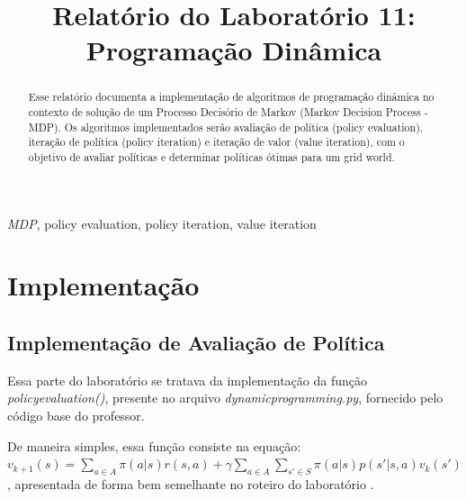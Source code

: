 \documentclass[conference]{IEEEtran}
\begin{document}
\title{Relatório do Laboratório 11: \\ Programação Dinâmica\\
}

\author{
}

\maketitle

\begin{abstract}
Esse relatório documenta a implementação de algoritmos de programação dinâmica no contexto de solução de um Processo Decisório de Markov (Markov Decision Process - MDP). Os algoritmos implementados serão avaliação de política (policy evaluation), iteração de política (policy iteration) e iteração de valor (value iteration), com o objetivo de avaliar políticas e determinar políticas ótimas para um grid world.
\end{abstract}

\begin{IEEEkeywords}
\textit{MDP}, policy evaluation, policy iteration, value iteration
\end{IEEEkeywords}

\section{Implementação}

\subsection{Implementação de Avaliação de Política}
Essa parte do laboratório se tratava da implementação da função \textit{policy\underline{\space}evaluation()}, presente no arquivo \textit{dynamic\underline{\space}programming.py}, fornecido pelo código base do professor. 

De maneira simples, essa função consiste na equação: $v_{k+1}\left ( s \right ) = \sum_{a\in A} \pi \left ( a|s \right ) r \left ( s, a \right ) + \gamma \sum_{a\in A} \sum_{s'\in S} \pi \left ( a|s \right ) p \left ( s' | s, a \right ) v_k \left ( s' \right )$, apresentada de forma bem semelhante no roteiro do laboratório \cite{roteiro}.
\end{document}
